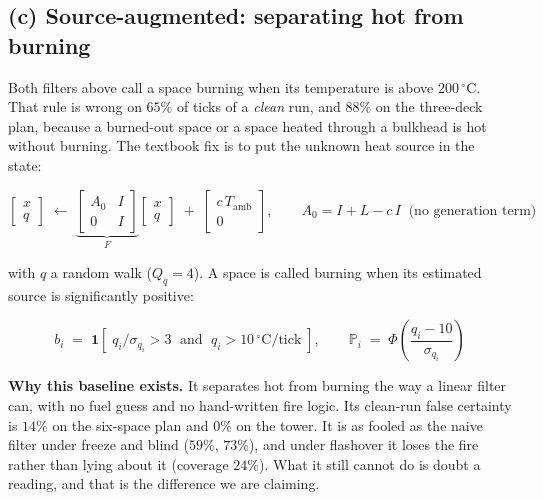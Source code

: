 \documentclass[11pt]{article}
\newcommand{\Tamb}{T_{\mathrm{amb}}}
\newcommand{\onetrue}[1]{\mathbf{1}\!\left[#1\right]}
\newcommand{\degC}{^\circ\mathrm{C}}
\begin{document}
\subsection*{(c) Source-augmented: separating hot from burning}

Both filters above call a space burning when its temperature is above $200\,\degC$. That rule is wrong on $65\%$ of ticks of a \emph{clean} run, and $88\%$ on the three-deck plan, because a burned-out space or a space heated through a bulkhead is hot without burning. The textbook fix is to put the unknown heat source in the state:

\begin{equation}
  \begin{bmatrix} x \\ q \end{bmatrix}
  \;\leftarrow\;
  \underbrace{\begin{bmatrix} A_0 & I \\ 0 & I \end{bmatrix}}_{F}
  \begin{bmatrix} x \\ q \end{bmatrix}
  \;+\;
  \begin{bmatrix} c\,\Tamb \\ 0 \end{bmatrix},
  \qquad A_0 = I + L - c\,I \;\;\text{(no generation term)}
\end{equation}

with $q$ a random walk ($Q_q = 4$). A space is called burning when its estimated source is significantly positive:

\begin{equation}
  b_i \;=\; \onetrue{\; q_i / \sigma_{q_i} > 3 \;\text{ and }\; q_i > 10\,\degC/\text{tick}\;},
  \qquad
  \mathbb{P}_i \;=\; \Phi\!\left(\frac{q_i - 10}{\sigma_{q_i}}\right)
\end{equation}

\begin{keybox}
\textbf{Why this baseline exists.} It separates hot from burning the way a linear filter can, with no fuel guess and no hand-written fire logic. Its clean-run false certainty is $14\%$ on the six-space plan and $0\%$ on the tower. It is as fooled as the naive filter under freeze and blind ($59\%$, $73\%$), and under flashover it loses the fire rather than lying about it (coverage $24\%$). What it still cannot do is doubt a reading, and that is the difference we are claiming.
\end{keybox}
\end{document}
